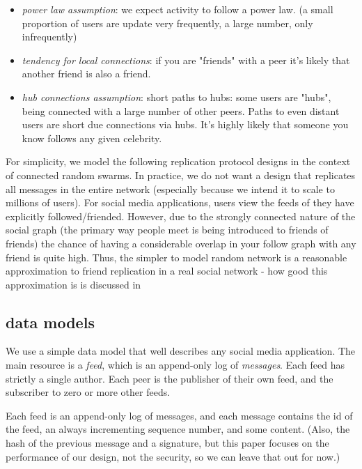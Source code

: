 \documentclass[sigconf]{acmart}
\begin{document}
\begin{itemize}

\item {\em power law assumption}: we expect activity to follow a power
  law.  (a small proportion of users are update very frequently, a
  large number, only infrequently)

\item {\em tendency for local connections}: if you are "friends" with
  a peer it's likely that another friend is also a friend.

\item {\em hub connections assumption}: short paths to hubs: some
  users are "hubs", being connected with a large number of other
  peers. Paths to even distant users are short due connections via
  hubs. It's highly likely that someone you know follows any given
  celebrity.

\end{itemize}

For simplicity, we model the following replication protocol designs in
the context of connected random swarms.  In practice, we do not want a
design that replicates all messages in the entire network (especially
because we intend it to scale to millions of users). For social media
applications, users view the feeds of they have explicitly
followed/friended. However, due to the strongly connected nature of
the social graph (the primary way people meet is being introduced to
friends of friends) the chance of having a considerable overlap in
your follow graph with any friend is quite high. Thus, the simpler to
model random network is a reasonable approximation to friend
replication in a real social network - how good this approximation is
is discussed in


\subsection{data models}

We use a simple data model that well describes any social media
application.  The main resource is a {\em feed}, which is an
append-only log of {\em messages}.  Each feed has strictly a single
author. Each peer is the publisher of their own feed, and the
subscriber to zero or more other feeds.

Each feed is an append-only log of messages, and each message contains
the id of the feed, an always incrementing sequence number, and some
content.  (Also, the hash of the previous message and a signature, but
this paper focuses on the performance of our design, not the security,
so we can leave that out for now.)
\end{document}
